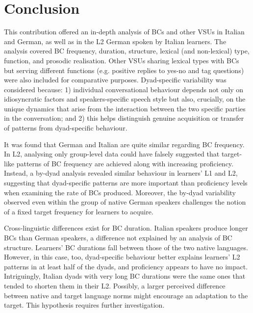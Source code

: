 \section{Conclusion}
\label{sec:4.4}
This contribution offered an in-depth analysis of BCs and other VSUs in Italian and German, as well as in the L2 German spoken by Italian learners. The analysis covered BC frequency, duration, structure, lexical (and non-lexical) type, function, and prosodic realisation. Other VSUs sharing lexical types with BCs but serving different functions (e.g. positive replies to yes-no and tag questions) were also included for comparative purposes. Dyad-specific variability was considered because: 1) individual conversational behaviour depends not only on idiosyncratic factors and speakers-specific speech style but also, crucially, on the unique dynamics that arise from the interaction between the two specific parties in the conversation; and 2) this helps distinguish genuine acquisition or transfer of patterns from dyad-specific behaviour.

It was found that German and Italian are quite similar regarding BC frequency. In L2, analysing only group-level data could have falsely suggested that target-like patterns of BC frequency are achieved along with increasing proficiency. Instead, a by-dyad analysis revealed similar behaviour in learners’ L1 and L2, suggesting that dyad-specific patterns are more important than proficiency levels when examining the rate of BCs produced. Moreover, the by-dyad variability observed even within the group of native German speakers challenges the notion of a fixed target frequency for learners to acquire.

Cross-linguistic differences exist for BC duration. Italian speakers produce longer BCs than German speakers, a difference not explained by an analysis of BC structure. Learners' BC durations fall between those of the two native languages. However, in this case, too, dyad-specific behaviour better explains learners’ L2 patterns in at least half of the dyads, and proficiency appears to have no impact. Intriguingly, Italian dyads with very long BC durations were the same ones that tended to shorten them in their L2. Possibly, a larger perceived difference between native and target language norms might encourage an adaptation to the target. This hypothesis requires further investigation.

